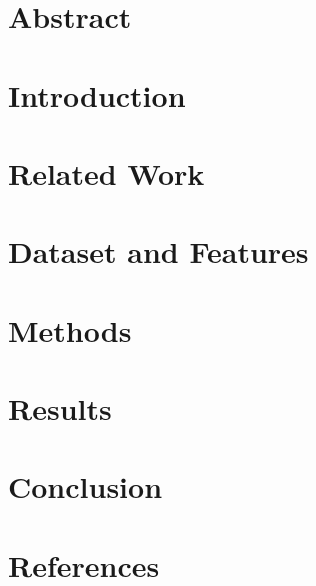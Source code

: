 \documentclass{IEEEconf}
\begin{document}
\section{Abstract}


\section{Introduction}


\section{Related Work}


\section{Dataset and Features}


\section{Methods}


\section{Results}


\section{Conclusion}


\section{References}
\end{document}
